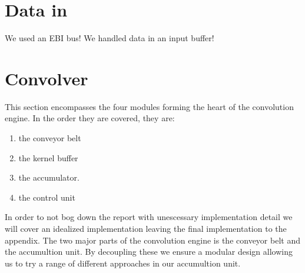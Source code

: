 \section{Data in}

We used an EBI bus!
We handled data in an input buffer!

\section{Convolver}
This section encompasses the four modules forming the heart of the convolution engine. In the order they are covered, they are:
\begin{enumerate}
    \item the conveyor belt 
    \item the kernel buffer 
    \item the accumulator.
    \item the control unit
\end{enumerate}
In order to not bog down the report with unescessary implementation detail we will cover an idealized implementation leaving the final implementation to the appendix.
The two major parts of the convolution engine is the conveyor belt and the accumultion unit. By decoupling these we ensure a modular design allowing us to try a range of different approaches in our accumultion unit.

